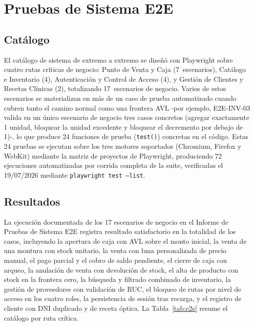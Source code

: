 \documentclass[conference]{IEEEtran}
\begin{document}
\section{Pruebas de Sistema E2E}
\label{sec:e2e}

\subsection{Catálogo}

El catálogo de sistema de extremo a extremo se diseñó con Playwright sobre cuatro rutas críticas de negocio: Punto de Venta y Caja (7~escenarios), Catálogo e Inventario (4), Autenticación y Control de Acceso (4), y Gestión de Clientes y Recetas Clínicas (2), totalizando 17~escenarios de negocio. Varios de estos escenarios se materializan en más de un caso de prueba automatizado cuando cubren tanto el camino normal como una frontera AVL -por ejemplo, E2E-INV-03 valida en un único escenario de negocio tres casos concretos (agregar exactamente 1 unidad, bloquear la unidad excedente y bloquear el decremento por debajo de 1)-, lo que produce 24 funciones de prueba (\texttt{test()}) concretas en el código. Estas 24 pruebas se ejecutan sobre los tres motores soportados (Chromium, Firefox y WebKit) mediante la matriz de proyectos de Playwright, produciendo 72 ejecuciones automatizadas por corrida completa de la suite, verificadas el 19/07/2026 mediante \texttt{playwright~test~--list}.

\subsection{Resultados}

La ejecución documentada de los 17 escenarios de negocio en el Informe de Pruebas de Sistema E2E registra resultado satisfactorio en la totalidad de los casos, incluyendo la apertura de caja con AVL sobre el monto inicial, la venta de una montura con stock unitario, la venta con luna personalizada de precio manual, el pago parcial y el cobro de saldo pendiente, el cierre de caja con arqueo, la anulación de venta con devolución de stock, el alta de producto con stock en la frontera cero, la búsqueda y filtrado combinado de inventario, la gestión de proveedores con validación de RUC, el bloqueo de rutas por nivel de acceso en los cuatro roles, la persistencia de sesión tras recarga, y el registro de cliente con DNI duplicado y de receta óptica. La Tabla~\ref{tab:e2e} resume el catálogo por ruta crítica.
\end{document}
